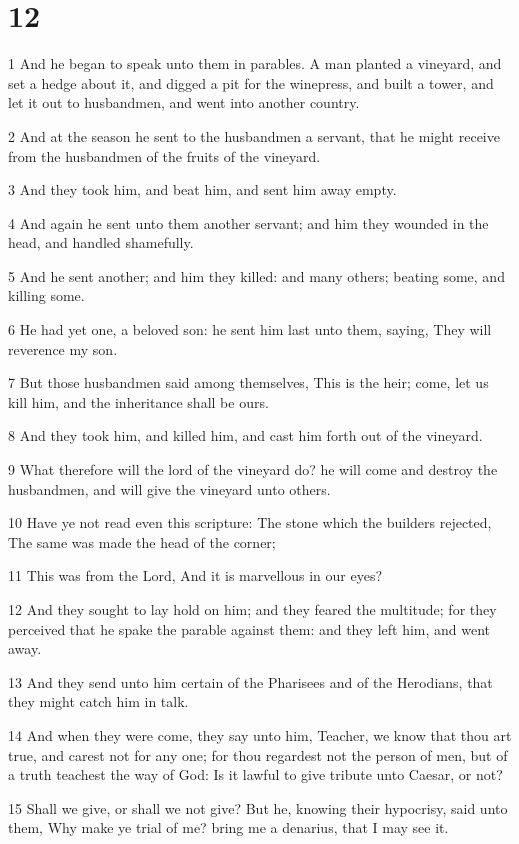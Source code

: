 \chapter{12}

\par 1 And he began to speak unto them in parables. A man planted a vineyard, and set a hedge about it, and digged a pit for the winepress, and built a tower, and let it out to husbandmen, and went into another country.
\par 2 And at the season he sent to the husbandmen a servant, that he might receive from the husbandmen of the fruits of the vineyard.
\par 3 And they took him, and beat him, and sent him away empty.
\par 4 And again he sent unto them another servant; and him they wounded in the head, and handled shamefully.
\par 5 And he sent another; and him they killed: and many others; beating some, and killing some.
\par 6 He had yet one, a beloved son: he sent him last unto them, saying, They will reverence my son.
\par 7 But those husbandmen said among themselves, This is the heir; come, let us kill him, and the inheritance shall be ours.
\par 8 And they took him, and killed him, and cast him forth out of the vineyard.
\par 9 What therefore will the lord of the vineyard do? he will come and destroy the husbandmen, and will give the vineyard unto others.
\par 10 Have ye not read even this scripture: The stone which the builders rejected, The same was made the head of the corner;
\par 11 This was from the Lord, And it is marvellous in our eyes?
\par 12 And they sought to lay hold on him; and they feared the multitude; for they perceived that he spake the parable against them: and they left him, and went away.
\par 13 And they send unto him certain of the Pharisees and of the Herodians, that they might catch him in talk.
\par 14 And when they were come, they say unto him, Teacher, we know that thou art true, and carest not for any one; for thou regardest not the person of men, but of a truth teachest the way of God: Is it lawful to give tribute unto Caesar, or not?
\par 15 Shall we give, or shall we not give? But he, knowing their hypocrisy, said unto them, Why make ye trial of me? bring me a denarius, that I may see it.
